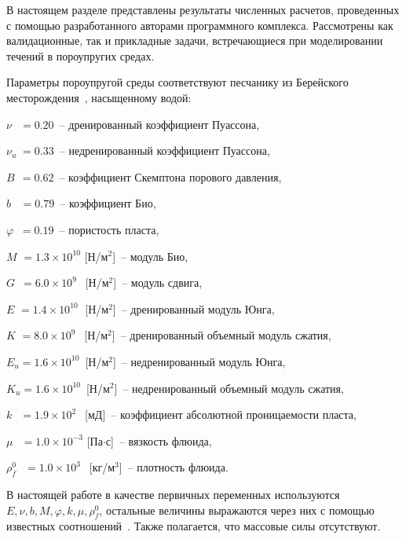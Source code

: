 %
% 
% 


В настоящем разделе представлены результаты численных расчетов, проведенных с помощью разработанного авторами
программного комплекса. Рассмотрены как валидационные, так и прикладные задачи, встречающиеся при моделировании
течений в пороупругих средах.

Параметры пороупругой среды соответствуют песчанику из Берейского месторождения~\cite{detournay_1993},
насыщенному водой:
%
\begin{description}
%
\item $\nu \;\;\,  = 0.20$~-- дренированный коэффициент Пуассона,
\item $\nu_u \;= 0.33$~-- недренированный коэффициент Пуассона,
\item $B \;\,    = 0.62$~-- коэффициент Скемптона порового давления,
\item $b \;\;\;    = 0.79$~-- коэффициент Био,
\item $\varphi \;\;= 0.19$~-- пористость пласта,
\item $M \,\,    = 1.3 \times 10^{10}$  [Н/м$^2$]~-- модуль Био,
\item $G \,\,\,    = 6.0 \times 10^9\;\,$  [Н/м$^2$]~-- модуль сдвига,
\item $E \,\,    = 1.4 \times 10^{10}\;$  [Н/м$^2$]~-- дренированный модуль Юнга, 
\item $K \,\,    = 8.0 \times 10^9\;\,$  [Н/м$^2$]~-- дренированный объемный модуль сжатия, 
\item $E_u   = 1.6 \times 10^{10}\,$  [Н/м$^2$]~-- недренированный модуль Юнга, 
\item $K_u   = 1.6 \times 10^{10}\,$ [Н/м$^2$]~-- недренированный объемный модуль сжатия,
\item $k \;\;\,    = 1.9 \times 10^2\;\,$  [мД]~-- коэффициент абсолютной проницаемости пласта,
\item $\mu \;\;\,  = 1.0 \times 10^{-3}$  [Па$\cdot$с]~-- вязкость флюида,
\item $\rho_f^0 \;\;\,  = 1.0 \times 10^{3}\;\,$ [кг/м$^3$]~-- плотность флюида.
%
\end{description}
%

В настоящей работе в качестве первичных переменных используются $E, \nu, b, M, \varphi, k, \mu , \rho_f^0$,
остальные величины выражаются через них с помощью известных соотношений~\cite{coussy_2004}. Также полагается, что массовые силы отсутствуют.

